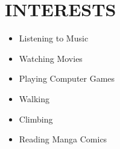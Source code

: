 \documentclass[letterpaper,11pt]{article}
\newcommand{\resumeSubHeadingListStart}{\begin{itemize}[leftmargin=0.0in, label={}]}
\newcommand{\resumeSubHeadingListEnd}{\end{itemize}}
\begin{document}
 
\section{INTERESTS}
        \begin{multicols}{4}
            \begin{itemize}[itemsep=-2pt, parsep=5pt]
                \item Listening to Music
                \item Watching Movies
                \item Playing Computer Games
                \item Walking
                \item Climbing
                \item Reading Manga Comics
            \end{itemize}
            
        \end{multicols}
 
\end{document}
